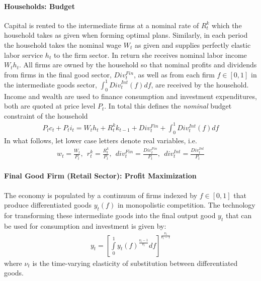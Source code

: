 \documentclass{article}
\begin{document}
\paragraph{Households: Budget}
Capital is rented to the intermediate firms at a nominal rate of $R^k_{t}$ which the household takes as given when forming optimal plans.
Similarly, in each period the household takes the nominal wage $W_t$ as given and supplies perfectly elastic labor service $h_t$ to the firm sector.
In return she receives nominal labor income $W_t h_t$.
All firms are owned by the household so that nominal profits and dividends from firms in the final good sector, $ Div^{Fin}_t$,
  as well as from each firm $f\in[0,1]$ in the intermediate goods sector, $\int_0^1 {Div}^{Int}_t(f)df$,
  are received by the household.
Income and wealth are used to finance consumption and investment expenditures, both are quoted at price level $P_t$.
In total this defines the \emph{nominal} budget constraint of the household
\begin{align}
P_t c_t + P_t i_t =  W_t h_t + R^k_t k_{t-1} + Div^{Fin}_t + \int_0^1 Div^{Int}_t(f) df \label{eq:RBCMonopIrrInv.BudgetNominal}
\end{align}
In what follows, let lower case letters denote real variables, i.e.\
\begin{align*}
w_t=\frac{W_t}{P_t},~~ r^k_t = \frac{R^k_t}{P_t},~~ div^{Fin}_t = \frac{Div^{Fin}_t}{P_t},~~ div^{Int}_t = \frac{Div^{Int}_t}{P_t}
\end{align*}

\paragraph{Final Good Firm (Retail Sector): Profit Maximization}
The economy is populated by a continuum of firms indexed by $f \in [0,1]$ that produce differentiated goods $y_t(f)$ in monopolistic competition.
The technology for transforming these intermediate goods into the final output good $y_t$ that can be used for consumption and investment is given by:
\begin{align}
y_t = \left[\int\limits_0^1 y_t(f)^{\frac{\nu_t-1}{\nu_t}}df\right]^{\frac{\nu_t}{\nu_t-1}} \label{eq:RBCMonopIrrInv.Firms.Aggregator}
\end{align}
where $\nu_t$ is the time-varying elasticity of substitution between differentiated goods.
\end{document}
